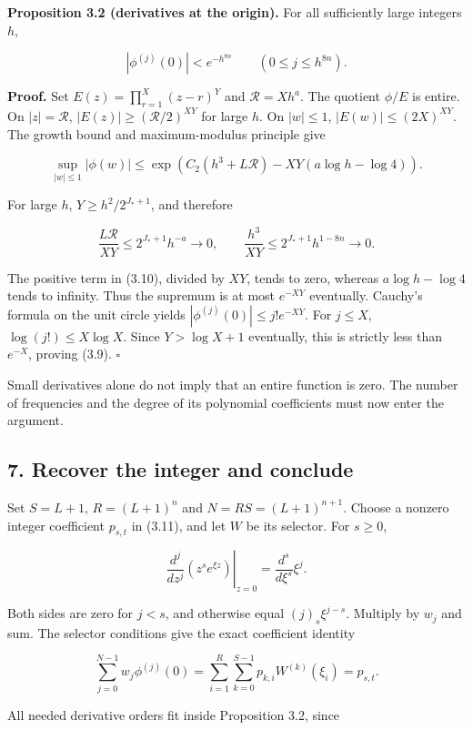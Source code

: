 \documentclass[
  11pt,
  a4paper,
]{article}
\begin{document}
\textbf{Proposition 3.2 (derivatives at the origin).} For all
sufficiently large integers \(h\),

\[
|\phi^{(j)}(0)|<e^{-h^{8n}}\qquad(0\le j\le h^{8n}). \tag{3.9}
\]

\textbf{Proof.} Set \(E(z)=\prod_{r=1}^{X}(z-r)^Y\) and
\(\mathcal R=Xh^a\). The quotient \(\phi/E\) is entire. On
\(|z|=\mathcal R\), \(|E(z)|\ge(\mathcal R/2)^{XY}\) for large \(h\). On
\(|w|\le1\), \(|E(w)|\le(2X)^{XY}\). The growth bound and
maximum-modulus principle give

\[
\sup_{|w|\le1}|\phi(w)|\le
\exp\!\left(C_2(h^3+L\mathcal R)-XY(a\log h-\log4)\right). \tag{3.10}
\]

For large \(h\), \(Y\ge h^2/2^{J_*+1}\), and therefore

\[
\frac{L\mathcal R}{XY}\le 2^{J_*+1}h^{-a}\longrightarrow0,\qquad
\frac{h^3}{XY}\le2^{J_*+1}h^{1-8n}\longrightarrow0.
\]

The positive term in (3.10), divided by \(XY\), tends to zero, whereas
\(a\log h-\log4\) tends to infinity. Thus the supremum is at most
\(e^{-XY}\) eventually. Cauchy's formula on the unit circle yields
\(|\phi^{(j)}(0)|\le j!e^{-XY}\). For \(j\le X\),
\(\log(j!)\le X\log X\). Since \(Y>\log X+1\) eventually, this is
strictly less than \(e^{-X}\), proving (3.9). \(\square\)

Small derivatives alone do not imply that an entire function is zero.
The number of frequencies and the degree of its polynomial coefficients
must now enter the argument.

\subsection{7. Recover the integer and
conclude}\label{recover-the-integer-and-conclude}

Set \(S=L+1\), \(R=(L+1)^n\) and \(N=RS=(L+1)^{n+1}\). Choose a nonzero
integer coefficient \(p_{s,t}\) in (3.11), and let \(W\) be its
selector. For \(s\ge0\),

\[
\left.\frac{d^j}{dz^j}(z^se^{\xi z})\right|_{z=0}
=\frac{d^s}{d\xi^s}\xi^j.
\]

Both sides are zero for \(j<s\), and otherwise equal \((j)_s\xi^{j-s}\).
Multiply by \(w_j\) and sum. The selector conditions give the exact
coefficient identity

\[
\sum_{j=0}^{N-1}w_j\phi^{(j)}(0)
=\sum_{i=1}^R\sum_{k=0}^{S-1}p_{k,i}W^{(k)}(\xi_i)
=p_{s,t}. \tag{3.15}
\]

All needed derivative orders fit inside Proposition 3.2, since
\end{document}
